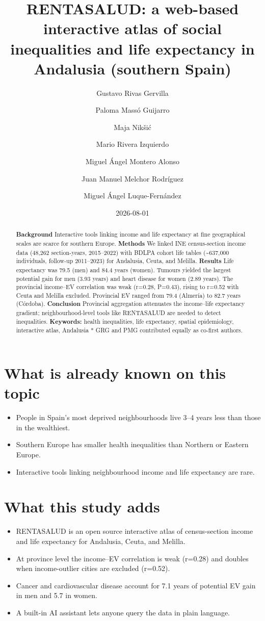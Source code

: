 \documentclass[
  11pt,
  a4paper,
]{article}
\title{RENTASALUD: a web-based interactive atlas of social inequalities
and life expectancy in Andalusia (southern Spain)}
\author{Gustavo Rivas Gervilla \and Paloma Massó Guijarro \and Maja
Nikšić \and Mario Rivera Izquierdo \and Miguel Ángel Montero
Alonso \and Juan Manuel Melchor Rodríguez \and Miguel Ángel
Luque-Fernández}
\date{2026-08-01}
\providecommand{\tightlist}{%
  \setlength{\itemsep}{0pt}\setlength{\parskip}{0pt}}
\begin{document}
\maketitle
\begin{abstract}
\textbf{Background} Interactive tools linking income and life expectancy
at fine geographical scales are scarce for southern Europe.
\textbf{Methods} We linked INE census-section income data (48,262
section-years, 2015--2022) with BDLPA cohort life tables
(\textasciitilde637,000 individuals, follow-up 2011--2023) for
Andalusia, Ceuta, and Melilla. \textbf{Results} Life expectancy was 79.5
(men) and 84.4 years (women). Tumours yielded the largest potential gain
for men (3.93 years) and heart disease for women (2.89 years). The
provincial income--EV correlation was weak (r=0.28, P=0.43), rising to
r=0.52 with Ceuta and Melilla excluded. Provincial EV ranged from 79.4
(Almería) to 82.7 years (Córdoba). \textbf{Conclusion} Provincial
aggregation attenuates the income--life expectancy gradient;
neighbourhood-level tools like RENTASALUD are needed to detect
inequalities. \textbf{Keywords:} health inequalities, life expectancy,
spatial epidemiology, interactive atlas, Andalusia * GRG and PMG
contributed equally as co-first authors.
\end{abstract}


\section{What is already known on this
topic}\label{what-is-already-known-on-this-topic}

\begin{itemize}
\tightlist
\item
  People in Spain's most deprived neighbourhoods live 3--4 years less
  than those in the wealthiest.
\item
  Southern Europe has smaller health inequalities than Northern or
  Eastern Europe.
\item
  Interactive tools linking neighbourhood income and life expectancy are
  rare.
\end{itemize}

\section{What this study adds}\label{what-this-study-adds}

\begin{itemize}
\tightlist
\item
  RENTASALUD is an open source interactive atlas of census-section
  income and life expectancy for Andalusia, Ceuta, and Melilla.
\item
  At province level the income--EV correlation is weak (r=0.28) and
  doubles when income-outlier cities are excluded (r=0.52).
\item
  Cancer and cardiovascular disease account for 7.1 years of potential
  EV gain in men and 5.7 in women.
\item
  A built-in AI assistant lets anyone query the data in plain language.
\end{itemize}
\end{document}
